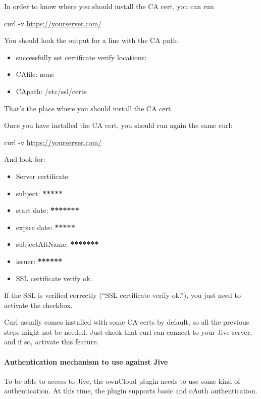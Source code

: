 \documentclass[letterpaper,10pt,english]{sphinxmanual}
\begin{document}
In order to know where you should install the CA cert, you can run

curl -v
\href{https://yourserver.com/}{https://yourserver.com/}

You should look the output for a line with the CA path:
\begin{itemize}
\item {} 
successfully set certificate verify locations:

\item {} 
CAfile: none

\item {} 
CApath: /etc/ssl/certs

\end{itemize}

That's the place where you should install the CA cert.

Once you have installed the CA cert, you should run again the same curl:

curl -v
\href{https://yourserver.com/}{https://yourserver.com/}

And look for:
\begin{itemize}
\item {} 
Server certificate:

\item {} 
subject: \textbf{*****}

\item {} 
start date: \textbf{*******}

\item {} 
expire date: \textbf{*****}

\item {} 
subjectAltName: \textbf{*******}

\item {} 
issuer: \textbf{******}

\item {} 
SSL certificate verify ok.

\end{itemize}

If the SSL is verified correctly (“SSL certificate verify ok.”), you just need to activate the checkbox.

Curl usually comes installed with some CA certs by default, so all the previous steps might not be needed. Just check
that curl can connect to your Jive server, and if so, activate this feature.


\paragraph{Authentication mechanism to use against Jive}
\label{enterprise_external_storage/jive_configuration:authentication-mechanism-to-use-against-jive}
To be able to access to Jive, the ownCloud plugin needs to use some kind of authentication. At this time, the plugin
supports basic and oAuth authentication.
\end{document}
